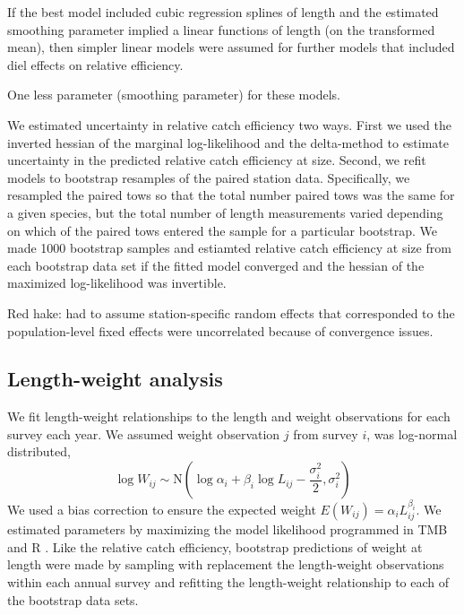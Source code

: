 \documentclass[]{article}
\begin{document}
If the best model included cubic regression splines of length and the
estimated smoothing parameter implied a linear functions of length (on
the transformed mean), then simpler linear models were assumed for
further models that included diel effects on relative efficiency.

One less parameter (smoothing parameter) for these models.

We estimated uncertainty in relative catch efficiency two ways. First we
used the inverted hessian of the marginal log-likelihood and the
delta-method to estimate uncertainty in the predicted relative catch
efficiency at size. Second, we refit models to bootstrap resamples of
the paired station data. Specifically, we resampled the paired tows so
that the total number paired tows was the same for a given species, but
the total number of length measurements varied depending on which of the
paired tows entered the sample for a particular bootstrap. We made 1000
bootstrap samples and estiamted relative catch efficiency at size from
each bootstrap data set if the fitted model converged and the hessian of
the maximized log-likelihood was invertible.

Red hake: had to assume station-specific random effects that
corresponded to the population-level fixed effects were uncorrelated
because of convergence issues.

\hypertarget{length-weight-analysis}{%
\subsection{Length-weight analysis}\label{length-weight-analysis}}

We fit length-weight relationships to the length and weight observations
for each survey each year. We assumed weight observation \(j\) from
survey \(i\), was log-normal distributed, \begin{equation}\label{wal}
 \log W_{ij} \sim \text{N}\left(\log \alpha_i + \beta_i \log L_{ij} - \frac{\sigma_i^2}{2}, \sigma_i^2\right)
\end{equation} We used a bias correction to ensure the expected weight
\(E(W_{ij})= \alpha_i L_{ij}^{\beta_i}\). We estimated parameters by
maximizing the model likelihood programmed in TMB
\citep{kristensenetal16} and R \citep{R19}. Like the relative catch
efficiency, bootstrap predictions of weight at length were made by
sampling with replacement the length-weight observations within each
annual survey and refitting the length-weight relationship to each of
the bootstrap data sets.
\end{document}
